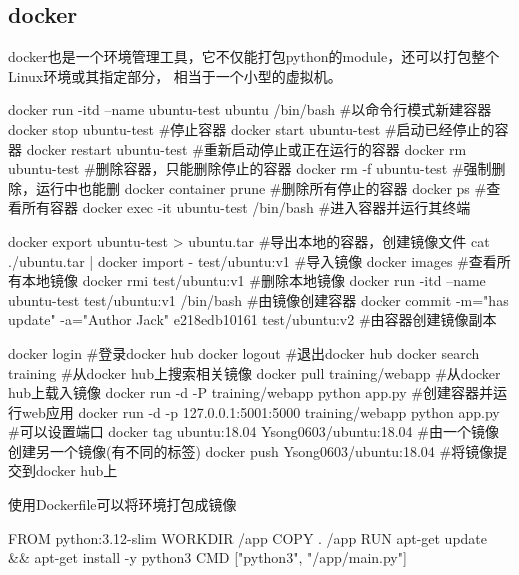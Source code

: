 \subsection{docker}
docker也是一个环境管理工具，它不仅能打包python的module，还可以打包整个Linux环境或其指定部分，
相当于一个小型的虚拟机。
\begin{codeblock}[language=bash, caption={docker}]
  docker run -itd --name ubuntu-test ubuntu /bin/bash #以命令行模式新建容器
  docker stop ubuntu-test #停止容器
  docker start ubuntu-test #启动已经停止的容器
  docker restart ubuntu-test #重新启动停止或正在运行的容器
  docker rm ubuntu-test #删除容器，只能删除停止的容器
  docker rm -f ubuntu-test #强制删除，运行中也能删
  docker container prune #删除所有停止的容器
  docker ps #查看所有容器
  docker exec -it ubuntu-test /bin/bash #进入容器并运行其终端
  
  docker export ubuntu-test > ubuntu.tar #导出本地的容器，创建镜像文件
  cat ./ubuntu.tar | docker import - test/ubuntu:v1 #导入镜像
  docker images #查看所有本地镜像
  docker rmi test/ubuntu:v1 #删除本地镜像
  docker run -itd --name ubuntu-test test/ubuntu:v1 /bin/bash #由镜像创建容器
  docker commit -m="has update" -a="Author Jack" e218edb10161 test/ubuntu:v2
  #由容器创建镜像副本
  
  docker login #登录docker hub
  docker logout #退出docker hub
  docker search training #从docker hub上搜索相关镜像
  docker pull training/webapp #从docker hub上载入镜像
  docker run -d -P training/webapp python app.py #创建容器并运行web应用
  docker run -d -p 127.0.0.1:5001:5000 training/webapp python app.py #可以设置端口
  docker tag ubuntu:18.04 Ysong0603/ubuntu:18.04 #由一个镜像创建另一个镜像(有不同的标签)
  docker push Ysong0603/ubuntu:18.04 #将镜像提交到docker hub上
\end{codeblock}

使用Dockerfile可以将环境打包成镜像
\begin{codeblock}[language=bash, caption={Dockerfile}]
  FROM python:3.12-slim
  WORKDIR /app
  COPY . /app
  RUN apt-get update && apt-get install -y python3
  CMD ["python3", "/app/main.py"]
\end{codeblock}

